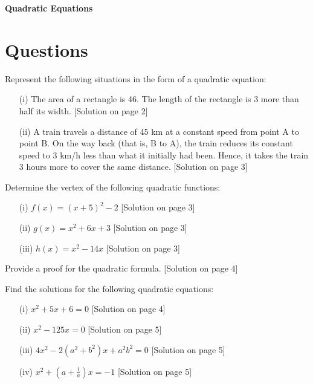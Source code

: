 \documentclass[addpoints, 12pt]{exam}
\theoremstyle{remark}
\begin{document}
\thispagestyle{empty}

\begin{center}
    {\LARGE \textbf{Quadratic Equations}}
\end{center}

\section{Questions}

\begin{questions}
\question Represent the following situations in the form of a quadratic equation:
\end{questions}

\begin{enumerate}
    \item[(i)] The area of a rectangle is 46. The length of the rectangle is 3 more than half its width. [Solution on page 2]
    \item[(ii)] A train travels a distance of 45 km at a constant speed from point A to point B. On the way back (that is, B to A), the train reduces its constant speed to 3 km/h less than what it initially had been. Hence, it takes the train 3 hours more to cover the same distance. [Solution on page 3]
\end{enumerate}

\question Determine the vertex of the following quadratic functions:
\begin{enumerate}
    \item[(i)] $f(x) = (x + 5)^2 - 2$ [Solution on page 3]
    \item[(ii)] $g(x) = x^2 + 6x + 3$ [Solution on page 3]
    \item[(iii)] $h(x) = x^2-14x$ [Solution on page 3]
\end{enumerate}

\question Provide a proof for the quadratic formula. [Solution on page 4]

\question Find the solutions for the following quadratic equations:
\begin{enumerate}
    \item[(i)] $x^2 + 5x + 6 = 0$ [Solution on page 4]
    \item[(ii)] $x^2-125x = 0$ [Solution on page 5]
    \item[(iii)] $4x^2 -2(a^2 + b^2)x +a^2b^2 = 0$ [Solution on page 5]
    \item[(iv)] $x^2 + \left(a + \frac{1}{a}\right)x = -1$ [Solution on page 5]
\end{enumerate}
\end{document}
